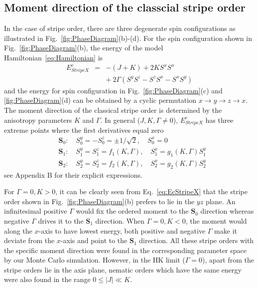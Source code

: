 \documentclass[aps,prb,reprint,amsfonts,amsmath,amssymb,showpacs,groupedaddress,superscriptaddress]{revtex4-1}
\begin{document}
\subsection{\label{sec:SectionIIIB}Moment direction of the classcial stripe order}
In the case of stripe order, there are three degenerate spin configurations as illustrated in Fig.~\ref{fig:PhaseDiagram}(b)-(d). For the spin configuration shown in Fig.~\ref{fig:PhaseDiagram}(b), the energy of the model Hamiltonian~\eqref{eq:Hamiltonian} is
\begin{eqnarray}
    E_{StripeX}^{c} & = & -(J + K) + 2 K S^x S^x \nonumber \\
        & & +\: 2 \Gamma (S^y S^z - S^z S^x - S^x S^y) \label{eq:EcStripeX}
\end{eqnarray}
and the energy for spin configuration in Fig.~\ref{fig:PhaseDiagram}(c) and \ref{fig:PhaseDiagram}(d) can be obtained by a cyclic permutation $x \rightarrow y \rightarrow z \rightarrow x$. The moment direction of the classical stripe order is determined by the anisotropy parameters $K$ and $\Gamma$. In general ($J,K,\Gamma \neq 0$), $E_{StripeX}^{c}$ has three extreme points where the first derivatives equal zero
\begin{subequations}
    \label{eq:whole}
    \begin{align}
        & \mathbf{S}_0: \quad S_{0}^{y}=-S_{0}^{z} = \pm1/\sqrt{2}, \quad S_{0}^{x} = 0 \label{eq:S0} \\
        & \mathbf{S}_1: \quad S_{1}^{y}=S_{1}^{z} = f_{1}(K, \Gamma), \quad S_{1}^{x} = g_{1}(K, \Gamma) S_{1}^{y} \label{eq:S1} \\
        & \mathbf{S}_2: \quad S_{2}^{y}=S_{2}^{z} = f_{2}(K, \Gamma), \quad S_{2}^{x} = g_{2}(K, \Gamma) S_{2}^{y} \label{eq:S2}
    \end{align}
\end{subequations}
see Appendix B for their explicit expressions.

For $\Gamma=0, K>0$, it can be clearly seen from Eq.~\eqref{eq:EcStripeX} that the stripe order shown in Fig.~\ref{fig:PhaseDiagram}(b) prefers to lie in the $yz$ plane. An infinitesimal positive $\Gamma$ would fix the ordered moment to the $\mathbf{S}_0$ direction whereas negative $\Gamma$ drives it to the $\mathbf{S}_1$ direction. When $\Gamma=0, K<0$, the moment would along the $x$-axis to have lowest energy, both positive and negative $\Gamma$ make it deviate from the $x$-axis and point to the $\mathbf{S}_1$ direction. All these stripe orders with the specific moment direction were found in the corresponding parameter space by our Monte Carlo simulation. However, in the HK limit ($\Gamma=0$), apart from the stripe orders lie in the axis plane, nematic orders which have the same energy were also found in the range $0 \leq |J| \ll K$.
\end{document}
